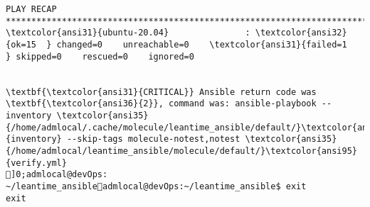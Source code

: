 \documentclass{scrartcl}
\begin{document}
\begin{Verbatim}
PLAY RECAP *******************************************************************************************************************************
\textcolor{ansi31}{ubuntu-20.04}               : \textcolor{ansi32}{ok=15  } changed=0    unreachable=0    \textcolor{ansi31}{failed=1   } skipped=0    rescued=0    ignored=0


\textbf{\textcolor{ansi31}{CRITICAL}} Ansible return code was \textbf{\textcolor{ansi36}{2}}, command was: ansible-playbook --inventory \textcolor{ansi35}{/home/admlocal/.cache/molecule/leantime_ansible/default/}\textcolor{ansi95}{inventory} --skip-tags molecule-notest,notest \textcolor{ansi35}{/home/admlocal/leantime_ansible/molecule/default/}\textcolor{ansi95}{verify.yml}
]0;admlocal@devOps: ~/leantime_ansibleadmlocal@devOps:~/leantime_ansible$ exit
exit

\end{Verbatim}
\end{document}
